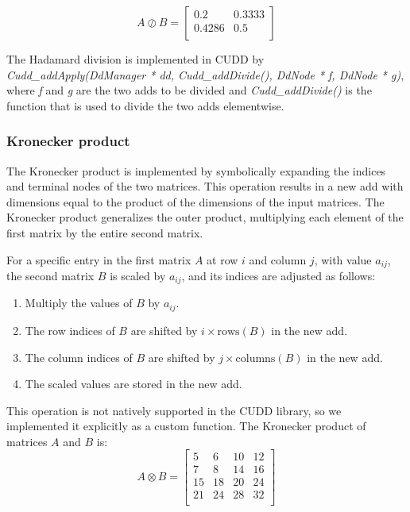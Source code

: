 \[
    A \oslash B = \begin{bmatrix}
        0.2    & 0.3333 \\
        0.4286 & 0.5    \\
    \end{bmatrix}
\]

The Hadamard division is implemented in CUDD by \textit{Cudd\_addApply(DdManager * dd, Cudd\_addDivide(), DdNode * f, DdNode * g)}, where \textit{f} and \textit{g} are the two \glspl{add} to be divided and \textit{Cudd\_addDivide()} is the function that is used to divide the two \glspl{add} elementwise.

\subsubsection{Kronecker product}
The Kronecker product is implemented by symbolically expanding the indices and terminal nodes of the two matrices.
This operation results in a new \gls{add} with dimensions equal to the product of the dimensions of the input matrices. 
The Kronecker product generalizes the outer product, multiplying each element of the first matrix by the entire second matrix.

For a specific entry in the first matrix $A$ at row $i$ and column $j$, with value $a_{ij}$, the second matrix $B$ is scaled by $a_{ij}$, and its indices are adjusted as follows:

\begin{enumerate}
\item Multiply the values of $B$ by $a_{ij}$.
\item The row indices of $B$ are shifted by $i \times \text{rows}(B)$ in the new \gls{add}.
\item The column indices of $B$ are shifted by $j \times \text{columns}(B)$ in the new \gls{add}.
\item The scaled values are stored in the new \gls{add}.
\end{enumerate}

This operation is not natively supported in the CUDD library, so we implemented it explicitly as a custom function. 
The Kronecker product of matrices $A$ and $B$ is:
\[
    A \otimes B = \begin{bmatrix}
        5  & 6  & 10 & 12 \\
        7  & 8  & 14 & 16 \\
        15 & 18 & 20 & 24 \\
        21 & 24 & 28 & 32 \\
    \end{bmatrix}
\]

